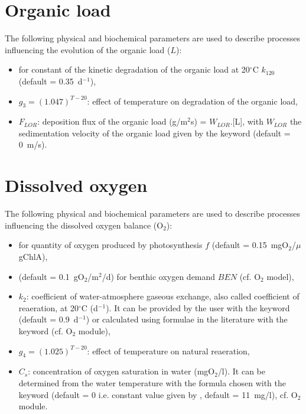 \section{Organic load}

The following physical and biochemical parameters are used to describe processes
influencing the evolution of the organic load ($L$):

\begin{itemize}
\item {}
  for constant of the kinetic degradation of the organic load at 20$^{\circ}$C $k_{120}$
  (default = 0.35~d$^{-1}$),
\item $g_3 = (1.047)^{T-20}$: effect of temperature on degradation of the organic load,
\item $F_{LOR}$: deposition flux of the organic load (g/m$^2$s) = $W_{LOR}$.[L],
  with $W_{LOR}$ the sedimentation velocity of the organic load
  given by the keyword 
  (default = 0~m/s).
\end{itemize}

\section{Dissolved oxygen}

The following physical and biochemical parameters are used to describe processes
influencing the dissolved oxygen balance (O$_2$):

\begin{itemize}
\item {}
  for quantity of oxygen produced by photosynthesis $f$
  (default = 0.15~mgO$_2$/$\mu$gChlA),
\item  {} (default = 0.1~gO$_2$/m$^2$/d)
  for benthic oxygen demand $BEN$ (cf. O$_2$ model),
\item $k_2$: coefficient of water-atmosphere gaseous exchange,
  also called coefficient of reaeration, at 20$^{\circ}$C (d$^{-1}$).
  It can be provided by the user with the keyword
   (default = 0.9~d$^{-1}$)
  or calculated using formulae in the literature
  with the keyword  (cf. O$_2$ module),
\item $g_4 = (1.025)^{T-20}$: effect of temperature on natural reaeration,
\item $C_s$: concentration of oxygen saturation in water (mgO$_2$/l).
  It can be determined from the water temperature
  with the formula chosen with the keyword
   (default = 0 i.e. constant value given by
  , default = 11~mg/l),
  cf. O$_2$ module.
\end{itemize}


